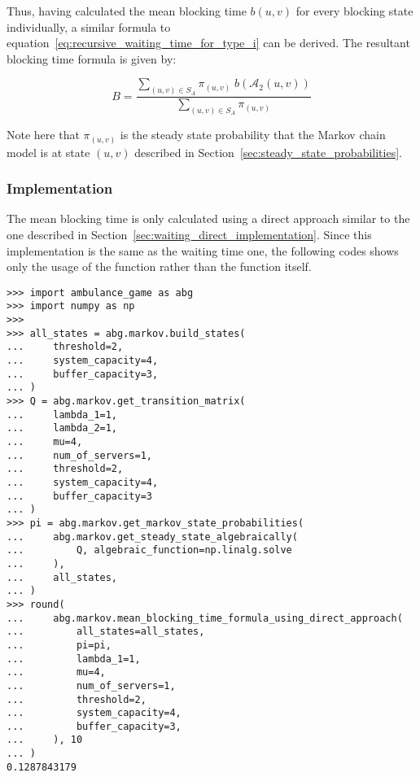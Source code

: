 Thus, having calculated the mean blocking time \(b(u,v)\) for every blocking
state individually, a similar formula to
equation~\eqref{eq:recursive_waiting_time_for_type_i} can be derived.
The resultant blocking time formula is given by:

\begin{equation}\label{eq:blocking_time_formula}
    B = \frac{\sum_{(u,v) \in S_A} \pi_{(u,v)} \; b(\mathcal{A}_2(u,v))}{
        \sum_{(u,v) \in S_A}\pi_{(u,v)}}
\end{equation}

Note here that \(\pi_(u,v)\) is the steady state probability that the Markov
chain model is at state \((u,v)\) described in
Section~\ref{sec:steady_state_probabilities}.

\subsubsection{Implementation}\label{sec:implementation_blocking_time}

The mean blocking time is only calculated using a direct approach
similar to the one described in Section~\ref{sec:waiting_direct_implementation}.
Since this implementation is the same as the waiting time one, the following
codes shows only the usage of the function rather than the function itself.

\begin{lstlisting}[style=pystyle]
>>> import ambulance_game as abg
>>> import numpy as np
>>>
>>> all_states = abg.markov.build_states(
...     threshold=2,
...     system_capacity=4,
...     buffer_capacity=3,
... )
>>> Q = abg.markov.get_transition_matrix(
...     lambda_1=1,
...     lambda_2=1,
...     mu=4,
...     num_of_servers=1,
...     threshold=2,
...     system_capacity=4,
...     buffer_capacity=3
... )
>>> pi = abg.markov.get_markov_state_probabilities(
...     abg.markov.get_steady_state_algebraically(
...         Q, algebraic_function=np.linalg.solve
...     ),
...     all_states,
... )
>>> round(
...     abg.markov.mean_blocking_time_formula_using_direct_approach(
...         all_states=all_states,
...         pi=pi,
...         lambda_1=1,
...         mu=4,
...         num_of_servers=1,
...         threshold=2,
...         system_capacity=4,
...         buffer_capacity=3,
...     ), 10
... )
0.1287843179

\end{lstlisting}
